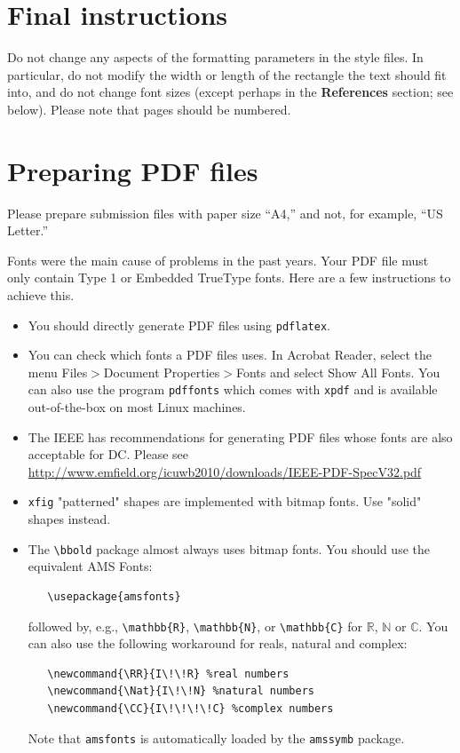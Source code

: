 \documentclass[11pt,a4paper]{article}
\begin{document}
\section{Final instructions}

Do not change any aspects of the formatting parameters in the style files.  In
particular, do not modify the width or length of the rectangle the text should
fit into, and do not change font sizes (except perhaps in the
\textbf{References} section; see below). Please note that pages should be
numbered.

\section{Preparing PDF files}

Please prepare submission files with paper size ``A4,'' and not, for
example, ``US Letter.''

Fonts were the main cause of problems in the past years. Your PDF file must only
contain Type 1 or Embedded TrueType fonts. Here are a few instructions to
achieve this.

\begin{itemize}

\item You should directly generate PDF files using \verb+pdflatex+.

\item You can check which fonts a PDF files uses.  In Acrobat Reader, select the
  menu Files$>$Document Properties$>$Fonts and select Show All Fonts. You can
  also use the program \verb+pdffonts+ which comes with \verb+xpdf+ and is
  available out-of-the-box on most Linux machines.

\item The IEEE has recommendations for generating PDF files whose fonts are also
  acceptable for DC. Please see
  \url{http://www.emfield.org/icuwb2010/downloads/IEEE-PDF-SpecV32.pdf}

\item \verb+xfig+ "patterned" shapes are implemented with bitmap fonts.  Use
  "solid" shapes instead.

\item The \verb+\bbold+ package almost always uses bitmap fonts.  You should use
  the equivalent AMS Fonts:
\begin{verbatim}
   \usepackage{amsfonts}
\end{verbatim}
followed by, e.g., \verb+\mathbb{R}+, \verb+\mathbb{N}+, or \verb+\mathbb{C}+
for $\mathbb{R}$, $\mathbb{N}$ or $\mathbb{C}$.  You can also use the following
workaround for reals, natural and complex:
\begin{verbatim}
   \newcommand{\RR}{I\!\!R} %real numbers
   \newcommand{\Nat}{I\!\!N} %natural numbers
   \newcommand{\CC}{I\!\!\!\!C} %complex numbers
\end{verbatim}
Note that \verb+amsfonts+ is automatically loaded by the \verb+amssymb+ package.

\end{itemize}
\end{document}

